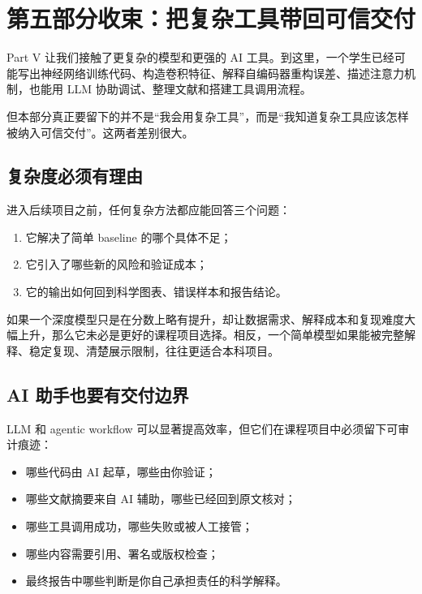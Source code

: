\chapter*{第五部分收束：把复杂工具带回可信交付}

Part V 让我们接触了更复杂的模型和更强的 AI 工具。到这里，一个学生已经可能写出神经网络训练代码、构造卷积特征、解释自编码器重构误差、描述注意力机制，也能用 LLM 协助调试、整理文献和搭建工具调用流程。

但本部分真正要留下的并不是“我会用复杂工具”，而是“我知道复杂工具应该怎样被纳入可信交付”。这两者差别很大。

\section*{复杂度必须有理由}

进入后续项目之前，任何复杂方法都应能回答三个问题：

\begin{enumerate}
    \item 它解决了简单 baseline 的哪个具体不足；
    \item 它引入了哪些新的风险和验证成本；
    \item 它的输出如何回到科学图表、错误样本和报告结论。
\end{enumerate}

如果一个深度模型只是在分数上略有提升，却让数据需求、解释成本和复现难度大幅上升，那么它未必是更好的课程项目选择。相反，一个简单模型如果能被完整解释、稳定复现、清楚展示限制，往往更适合本科项目。

\section*{AI 助手也要有交付边界}

LLM 和 agentic workflow 可以显著提高效率，但它们在课程项目中必须留下可审计痕迹：

\begin{itemize}
    \item 哪些代码由 AI 起草，哪些由你验证；
    \item 哪些文献摘要来自 AI 辅助，哪些已经回到原文核对；
    \item 哪些工具调用成功，哪些失败或被人工接管；
    \item 哪些内容需要引用、署名或版权检查；
    \item 最终报告中哪些判断是你自己承担责任的科学解释。
\end{itemize}

